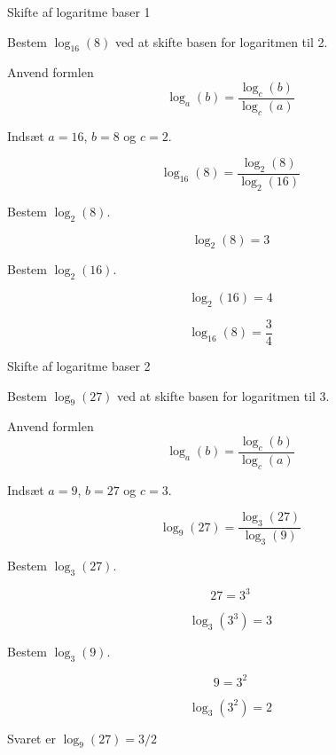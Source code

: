 \documentclass{article}
\begin{document}
\tableofcontents
\newpage

\begin{exercise}{Skifte af logaritme baser 1}

Bestem $\log_{16}(8)$ ved at skifte basen for logaritmen til 2.


\hint

Anvend formlen 
\[
\log_a(b) = \frac{\log_c(b)}{\log_c(a)}
\]

\hint

Indsæt $a=16$, $b=8$ og $c=2$.

\hint
\[
\log_{16}(8) = \frac{\log_2(8)}{\log_2(16)}
\]

\hint
Bestem $\log_2(8)$.

\hint
\[
\log_2(8) = 3
\]

\hint
Bestem $\log_2(16)$.

\hint
\[
\log_2(16) = 4
\]

\hint
\[
\log_{16}(8) = \frac{3}{4}
\]


\end{exercise}

\newpage
\begin{exercise}{Skifte af logaritme baser 2}
	
	Bestem $\log_{9}(27)$ ved at skifte basen for logaritmen til 3.
	
	
	\hint
	
	Anvend formlen 
	\[
	\log_a(b) = \frac{\log_c(b)}{\log_c(a)}
	\]
	
	\hint
	
	Indsæt $a=9$, $b=27$ og $c=3$.
	
	\hint
	\[
	\log_{9}(27) = \frac{\log_3(27)}{\log_3(9)}
	\]
	
	\hint
	Bestem $\log_3(27)$.
	
	\hint
	\[
	27  = 3^3	
	\]
	
	
	\hint
	\[
	\log_3(3^3) = 3
	\]
	
	\hint
	Bestem $\log_3(9)$.
	
	\hint
	\[
	9  = 3^2	
	\]
	
	\hint
	\[
	\log_3(3^2) = 2
	\]
	
	\hint
	Svaret er 	$\log_{9}(27) = 3/2$
	
	
\end{exercise}
\end{document}

